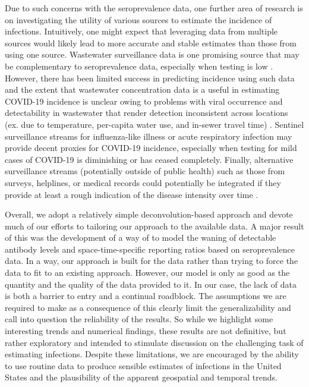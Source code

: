 \documentclass{article}
\begin{document}
Due to such concerns with the seroprevalence data, one further area of research
is on investigating the utility of various sources to estimate the incidence of
infections. Intuitively, one might expect that leveraging data from multiple
sources would likely lead to more accurate and stable estimates than those from
using one source. Wastewater surveillance data is one
promising source that may be complementary to seroprevalence data, especially
when testing is low \citep{mcmanus2023predicting}. However, there has been
limited success in predicting incidence using such data and the extent that
wastewater concentration data is a useful in estimating COVID-19 incidence is
unclear owing to problems with viral occurrence and detectability in wastewater
that render detection inconsistent across locations (ex. due to temperature,
per-capita water use, and in-sewer travel time) \citep{mcmanus2023predicting,
hart2020computational, li2023correlation}. Sentinel surveillance streams for
influenza-like illness or acute respiratory infection may provide decent proxies
for COVID-19 incidence, especially when testing for mild cases of COVID-19 is
diminishing or has ceased completely. Finally, alternative surveillance streams
(potentially outside of public health) such as those from surveys, helplines, or
medical records could potentially be integrated if they provide at least a rough
indication of the disease intensity over time \citep{ecdc2020strategies}.

Overall, we adopt a relatively simple deconvolution-based approach and devote
much of our efforts to tailoring our approach to the available data. A
major result of this was the development of a way of to model the waning
of detectable antibody levels and space-time-specific reporting ratios based on seroprevalence data.
In a way, our approach is built for the data rather than trying to force the data to fit
to an existing approach. However, our model is only as good as the quantity and 
the quality of the data provided to it. In our case, the lack of data is both a barrier to entry
and a continual roadblock. The assumptions we are required to make as a
consequence of this clearly limit the generalizability and call into question
the reliability of the results. So while we highlight some interesting trends and
numerical findings, these results are not definitive, but rather exploratory and
intended to stimulate discussion on the challenging task of estimating
infections. Despite these limitations, we are encouraged by the ability to use
routine data to produce sensible estimates of infections in the United States and the
plausibility of the apparent geospatial and temporal trends. 
 
\end{document}
